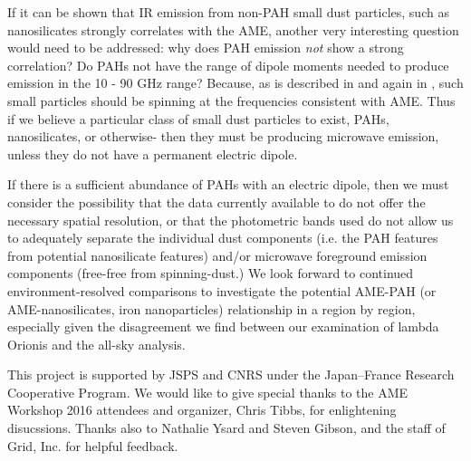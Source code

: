 \documentclass[preprint2,longabstract]{aastex}
\begin{document}
         If it can be shown that IR emission from non-PAH small dust particles, such as nanosilicates strongly correlates with the AME, another very interesting question would need to be addressed: why does PAH emission \textit{not} show a strong correlation? Do PAHs not have the range of dipole moments needed to produce emission in the 10 - 90 GHz range? Because, as is described in \cite{draine98a} and again in \cite{hensley17b}, such small particles should be spinning at the frequencies consistent with AME. Thus if we believe a particular class of small dust particles to exist, PAHs, nanosilicates, or otherwise- then they must be producing microwave emission, unless they do not have a permanent electric dipole.

        If there is a sufficient abundance of PAHs with an electric dipole, then we must consider the possibility that the data currently available to do not offer the necessary spatial resolution, or that the photometric bands used do not allow us to adequately separate the individual dust components (i.e. the PAH features from potential nanosilicate features) and/or microwave foreground emission components (free-free from spinning-dust.) We look forward to continued environment-resolved comparisons to investigate the potential AME-PAH (or AME-nanosilicates, iron nanoparticles) relationship in a region by region, especially given the disagreement we find between our examination of lambda Orionis and the all-sky analysis.


       This project is supported by JSPS and CNRS under the Japan--France Research Cooperative Program. We would like to give special thanks to the AME Workshop 2016 attendees and organizer, Chris Tibbs, for enlightening disucssions. Thanks also to Nathalie Ysard and Steven Gibson, and the staff of Grid, Inc. for helpful feedback.



\appendix
\end{document}
